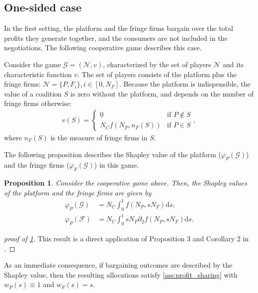 \documentclass[a4paper]{article}
\newtheorem{proposition}{Proposition}
\newcommand{\ds}{\mathrm{d}s}
\begin{document}
\subsection{One-sided case}
\label{sec:cooperative_game_one_sided}

In the first setting, the platform and the fringe firms bargain over the total profits they generate together, and the consumers are not included in the negotiations.
The following cooperative game describes this case.

Consider the game $\mathcal{G} = (\mathcal{N}, v)$, characterized by the set of players $\mathcal{N}$ and its characteristic function $v$.
The set of players consists of the platform plus the fringe firms: $\mathcal{N} = \{P, F_i\}, i \in [0, N_F]$.
Because the platform is indispensible, the value of a coalition $S$ is zero without the platform, and depends on the number of fringe firms otherwise:
\begin{align*}
    v(S) = \begin{cases}
        0 & \text{if } P \notin S \\
        N_C f(N_P, n_F(S)) & \text{if } P \in S
    \end{cases},
\end{align*}
where $n_F(S)$ is the measure of fringe firms in $S$.

The following proposition describes the Shapley value of the platform ($\varphi_P(\mathcal{G})$) and the fringe firms ($\varphi_F(\mathcal{G})$) in this game.

\begin{proposition}
    \label{prop:profit_sharing_one_sided}
    Consider the cooperative game above.
    Then, the Shapley values of the platform and the fringe firms are given by
    \begin{align*}
        \varphi_P(\mathcal{G}) &= N_C \int_0^1 f(N_P, s N_F) \ds, \\
        \varphi_P(\mathcal{F}) &= N_C \int_0^1 s N_F \partial_2 f(N_P, s N_F) \ds.
    \end{align*}
\end{proposition}

\begin{proof}[proof of \cref{prop:profit_sharing_one_sided}]
    This result is a direct application of Proposition 3 and Corollary 2 in \textcite{stancsics2023value}.
\end{proof}

As an immediate consequence, if bargaining outcomes are described by the Shapley value, then the resulting allocations satisfy \cref{ass:profit_sharing} with $w_P(s) \equiv 1$ and $w_F(s) = s$.
\end{document}
